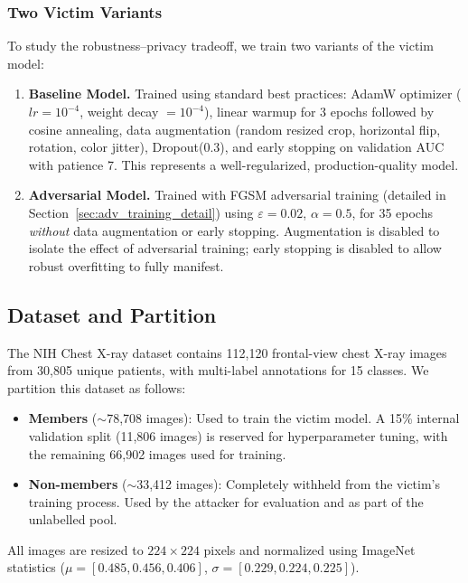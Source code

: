 \documentclass[conference]{IEEEtran}
\begin{document}
\subsubsection{Two Victim Variants}
To study the robustness--privacy tradeoff, we train two variants of the victim model:

\begin{enumerate}[leftmargin=*]
    \item \textbf{Baseline Model.} Trained using standard best practices: AdamW optimizer ($lr = 10^{-4}$, weight decay $= 10^{-4}$), linear warmup for 3 epochs followed by cosine annealing, data augmentation (random resized crop, horizontal flip, rotation, color jitter), Dropout(0.3), and early stopping on validation AUC with patience 7. This represents a well-regularized, production-quality model.
    
    \item \textbf{Adversarial Model.} Trained with FGSM adversarial training (detailed in Section~\ref{sec:adv_training_detail}) using $\varepsilon = 0.02$, $\alpha = 0.5$, for 35 epochs \textit{without} data augmentation or early stopping. Augmentation is disabled to isolate the effect of adversarial training; early stopping is disabled to allow robust overfitting to fully manifest.
\end{enumerate}

\subsection{Dataset and Partition}

The NIH Chest X-ray dataset contains 112,120 frontal-view chest X-ray images from 30,805 unique patients, with multi-label annotations for 15 classes. We partition this dataset as follows:

\begin{itemize}[leftmargin=*]
    \item \textbf{Members} ($\sim$78,708 images): Used to train the victim model. A 15\% internal validation split (11,806 images) is reserved for hyperparameter tuning, with the remaining 66,902 images used for training.
    \item \textbf{Non-members} ($\sim$33,412 images): Completely withheld from the victim's training process. Used by the attacker for evaluation and as part of the unlabelled pool.
\end{itemize}

All images are resized to $224 \times 224$ pixels and normalized using ImageNet statistics ($\mu = [0.485, 0.456, 0.406]$, $\sigma = [0.229, 0.224, 0.225]$).
\end{document}
